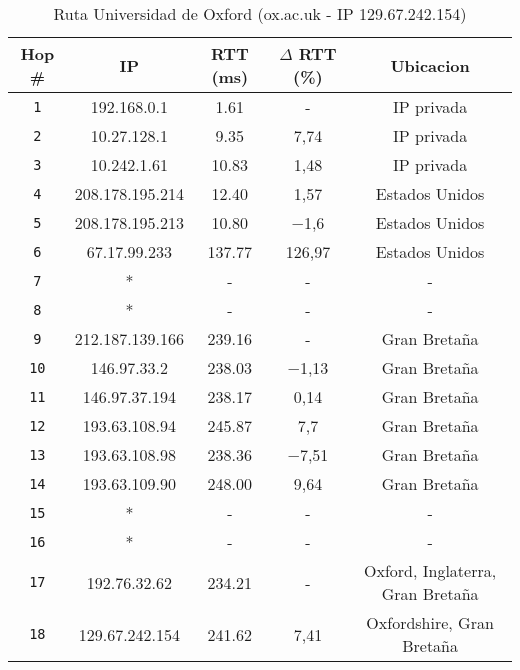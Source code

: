 \begin{table}[ht]\begin{center}
    \begin{tabular}{|c|c|c|c|c|}
    \hline
    \textbf{Hop \#} & \textbf{IP}& \textbf{RTT (ms)} & \textbf{$\Delta$ RTT (\%)} & \textbf{Ubicacion} \\ \hline
    \texttt{1} & 192.168.0.1      &1.61       & -       & IP privada   \\ \hline
    \texttt{2} & 10.27.128.1      &9.35       & 7,74       & IP privada  \\ \hline
    \texttt{3} & 10.242.1.61      & 10.83     & 1,48       & IP privada  \\ \hline
    \texttt{4} & 208.178.195.214  & 12.40     & 1,57       & Estados Unidos   \\ \hline
    \texttt{5} & 208.178.195.213  & 10.80     & −1,6       & Estados Unidos   \\ \hline
    \texttt{6} & 67.17.99.233     & 137.77    & 126,97       & Estados Unidos    \\ \hline
    \texttt{7} & *                & -        & -       & -   \\ \hline
    \texttt{8} & *                & -        & -       & -   \\ \hline
    \texttt{9} & 212.187.139.166  & 239.16    & -       & Gran Bretaña   \\ \hline
    \texttt{10} & 146.97.33.2     & 238.03    & −1,13       & Gran Bretaña   \\ \hline
    \texttt{11} & 146.97.37.194   & 238.17    & 0,14       & Gran Bretaña    \\ \hline
    \texttt{12} & 193.63.108.94   & 245.87    & 7,7       &  Gran Bretaña \\ \hline
    \texttt{13} & 193.63.108.98   & 238.36    & −7,51       & Gran Bretaña   \\ \hline
    \texttt{14} & 193.63.109.90   & 248.00    & 9,64       & Gran Bretaña    \\ \hline
    \texttt{15} & *               & -        & -       & -   \\ \hline
    \texttt{16} & *               & -        & -       & -    \\ \hline
    \texttt{17} & 192.76.32.62    & 234.21    & -       & Oxford, Inglaterra, Gran Bretaña   \\ \hline
    \texttt{18} & 129.67.242.154  & 241.62    & 7,41       & Oxfordshire, Gran Bretaña   \\ \hline
    \end{tabular}
    \caption{Ruta Universidad de Oxford (ox.ac.uk - IP 129.67.242.154)}
\end{center}\end{table}

